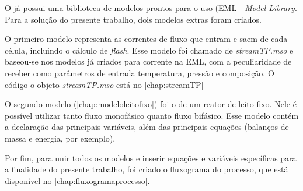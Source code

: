 O \emso já possui uma biblioteca de modelos prontos para o uso (EML -
\emph{\emso  Model Library}. Para a solução do presente trabalho, dois modelos
extras foram criados.

O primeiro modelo representa as correntes de fluxo que entram e saem de
cada célula, incluindo o cálculo de \emph{flash}. Esse modelo foi chamado de
\emph{streamTP.mso} e baseou-se nos modelos já criados para corrente na EML, com
a peculiaridade de receber como parâmetros de entrada temperatura, pressão e
composição. O código o objeto \emph{streamTP.mso} está no
\autoref{chap:streamTP}

O segundo modelo (\autoref{chap:modeloleitofixo}) foi o de um reator de leito
fixo. Nele é possível utilizar tanto fluxo monofásico quanto fluxo bifásico.
Esse modelo contém a declaração das principais variáveis, além das principais
equações (balanços de massa e energia, por exemplo).

Por fim, para unir todos os modelos e inserir equações e variáveis
específicas para a finalidade do presente trabalho, foi criado o fluxograma do
processo, que está disponível no \autoref{chap:fluxogramaprocesso}.






































